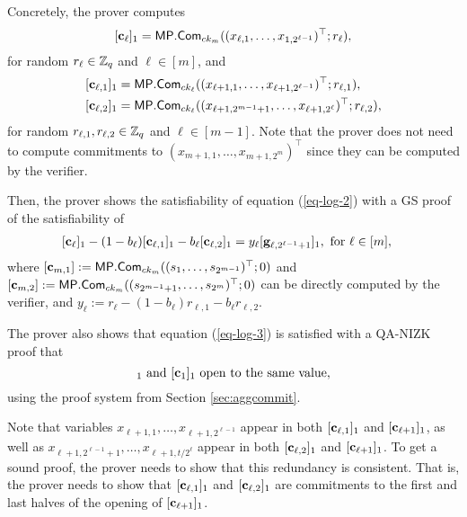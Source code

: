 Concretely, the prover computes
\begin{align*}
&[\mathbf{c}_\ell]_1=\mathsf{MP}.\mathsf{Com}_{ck_m}((x_{\ell,1},\ldots,x_{1,2^{\ell-1}})^\top;r_\ell),\\
\end{align*}
for random $r_\ell\in\mathbb{Z}_q$ and $\ell\in[m]$, and 
\begin{align*}
&[\mathbf{c}_{\ell,1}]_1=\mathsf{MP}.\mathsf{Com}_{ck_{\ell}}((x_{\ell+1,1},\ldots,x_{\ell+1,2^{\ell-1}})^\top;r_{\ell,1}),\\
&[\mathbf{c}_{\ell,2}]_1=\mathsf{MP}.\mathsf{Com}_{ck_{\ell}}((x_{\ell+1,2^{m-1}+1},\ldots,x_{\ell+1,2^\ell})^\top;r_{\ell,2}),\\
\end{align*}
for random $r_{\ell,1},r_{\ell,2}\in\mathbb{Z}_q$ and $\ell\in[m-1]$. Note that the prover does not need to compute commitments to $(x_{m+1,1},\ldots,x_{m+1,2^m})^\top$ since they can be computed by the verifier.

Then, the prover shows the satisfiability of equation (\ref{eq-log-2}) with a GS proof of
the satisfiability of
\begin{align}
&[\mathbf{c}_\ell]_1-(1-b_\ell)[\mathbf{c}_{\ell,1}]_1-b_\ell[\mathbf{c}_{\ell,2}]_1 = y_\ell[\mathbf{g}_{\ell,2^{\ell-1}+1}]_1, \text{ for } \ell \in[m],  \label{eq-log-5}
\end{align}
where $[\mathbf{c}_{m,1}]:=\mathsf{MP}.\mathsf{Com}_{ck_m}((s_1,\ldots,s_{2^{m-1}})^\top;0)$ and $[\mathbf{c}_{m,2}]:=\allowbreak \mathsf{MP}.\mathsf{Com}_{ck_m}(\allowbreak (s_{2^{m-1}+1},\allowbreak\ldots,s_{2^m})^\top;0)$ can be directly computed by the verifier, and $y_\ell:=r_\ell-(1-b_\ell)r_{\ell,1}-b_\ell r_{\ell,2}$.

The prover also shows that equation (\ref{eq-log-3}) is satisfied with a QA-NIZK proof that
\begin{equation}
[\vecb{c}]_1\text{ and }[\vecb{c}_1]_1\text{ open to the same value}, \label{eq-log-6}
\end{equation}
using the proof system from Section \ref{sec:aggcommit}.

Note that variables $x_{\ell+1,1},\ldots,x_{\ell+1,2^{\ell-1}}$ appear in both $[\mathbf{c}_{\ell,1}]_1$ and $[\mathbf{c}_{\ell+1}]_1$, as well as $x_{\ell+1,2^{\ell-1}+1},\ldots,x_{\ell+1,t/2^\ell}$ appear in both $[\mathbf{c}_{\ell,2}]_1$ and $[\mathbf{c}_{\ell+1}]_1$. To get a sound proof, the prover needs to show that this redundancy is consistent. That is, the prover needs to show that $[\mathbf{c}_{\ell,1}]_1$ and $[\mathbf{c}_{\ell,2}]_1$ are commitments to the first and last halves of the opening of $[\mathbf{c}_{\ell+1}]_1$.

